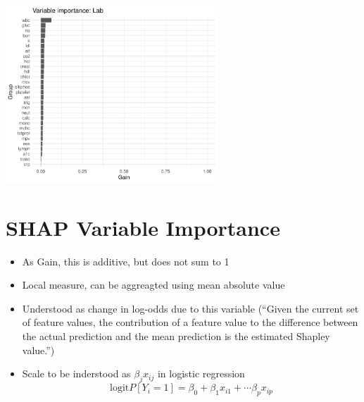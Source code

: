 \documentclass[12pt]{article}
\begin{document}
\begin{center}
\includegraphics[width=0.6\textwidth]{figures/pdp_new/vi_group_Lab.pdf}
\end{center}

\clearpage

\section*{SHAP Variable Importance}

\begin{itemize}
\item As Gain, this is  additive, but does not sum to 1
\item Local measure, can be aggreagted using mean absolute value 
\item Understood as change in log-odds due to this variable (``Given the current set of feature values, 
the contribution of a feature value to the difference between the actual prediction and the mean prediction is the estimated Shapley value.'')
\item Scale to be inderstood as $\beta_jx_{ij}$ in logistic regression $$\text{logit}P[Y_i=1] = \beta_0 + \beta_1x_{i1} + \cdots \beta_px_{ip}$$
\end{itemize}
\end{document}
